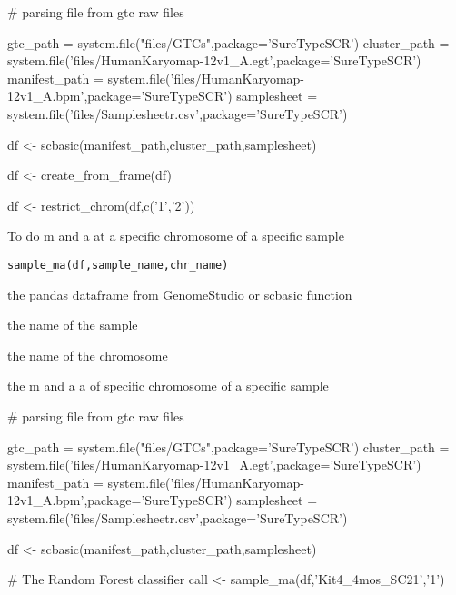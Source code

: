 \documentclass[a4paper]{book}
\begin{document}
\begin{Examples}
\begin{ExampleCode}

# parsing file from gtc raw files

gtc_path = system.file("files/GTCs",package='SureTypeSCR')
cluster_path = system.file('files/HumanKaryomap-12v1_A.egt',package='SureTypeSCR')
manifest_path = system.file('files/HumanKaryomap-12v1_A.bpm',package='SureTypeSCR')
samplesheet = system.file('files/Samplesheetr.csv',package='SureTypeSCR')

df <- scbasic(manifest_path,cluster_path,samplesheet)

df <- create_from_frame(df)

df <- restrict_chrom(df,c('1','2'))




\end{ExampleCode}
\end{Examples}
%
\begin{Description}\relax
To do m and a at a specific chromosome of a specific sample
\end{Description}
%
\begin{Usage}
\begin{verbatim}
sample_ma(df,sample_name,chr_name)
\end{verbatim}
\end{Usage}
%
\begin{Arguments}
\begin{ldescription}
\item[\code{df}] the pandas dataframe from GenomeStudio or scbasic function
\item[\code{sample\_name}] the name of the sample
\item[\code{chr\_name}] the name of the chromosome
\end{ldescription}
\end{Arguments}
%
\begin{Value}
the m and a a of specific chromosome of a specific sample
\end{Value}
%
\begin{Examples}
\begin{ExampleCode}

# parsing file from gtc raw files

gtc_path = system.file("files/GTCs",package='SureTypeSCR')
cluster_path = system.file('files/HumanKaryomap-12v1_A.egt',package='SureTypeSCR')
manifest_path = system.file('files/HumanKaryomap-12v1_A.bpm',package='SureTypeSCR')
samplesheet = system.file('files/Samplesheetr.csv',package='SureTypeSCR')

df <- scbasic(manifest_path,cluster_path,samplesheet)

# The Random Forest classifier
call <- sample_ma(df,'Kit4_4mos_SC21','1') 



\end{ExampleCode}
\end{Examples}
\end{document}
